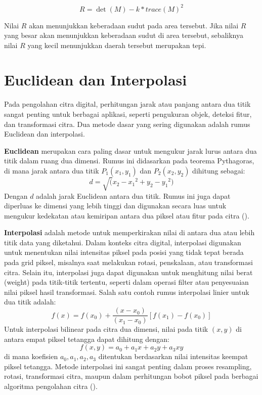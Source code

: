 \begin{equation}
  R = \det(M) - k * {trace(M)}^2
  \label{Harris-Corner Detection}
\end{equation}

  Nilai \(R\) akan menunjukkan keberadaan sudut pada area tersebut. 
Jika nilai \(R\) yang besar akan menunjukkan keberadaan sudut di area tersebut, sebaliknya nilai \(R\) yang kecil menunjukkan daerah tersebut merupakan tepi.

\section{Euclidean dan Interpolasi}
  Pada pengolahan citra digital, perhitungan jarak atau panjang antara dua titik sangat penting untuk berbagai aplikasi, seperti pengukuran objek, deteksi fitur, dan transformasi citra. Dua metode dasar yang sering digunakan adalah rumus Euclidean dan interpolasi.

  \textbf{Euclidean} merupakan cara paling dasar untuk mengukur jarak lurus antara dua titik dalam ruang dua dimensi. Rumus ini didasarkan pada teorema Pythagoras, di mana jarak antara dua titik \(P_1(x_1, y_1)\) dan \(P_2(x_2, y_2)\) dihitung sebagai:
\begin{equation}
  d = \sqrt({x_2 - x_1}^2 + {y_2 - y_1}^2)
  \label{eq:euclidean}
\end{equation}
  Dengan \(d\) adalah jarak Euclidean antara dua titik. Rumus ini juga dapat diperluas ke dimensi yang lebih tinggi dan digunakan secara luas untuk mengukur kedekatan atau kemiripan antara dua piksel atau fitur pada citra (\cite[hlm. 34]{Gonzalez2018}).

  \textbf{Interpolasi} adalah metode untuk memperkirakan nilai di antara dua atau lebih titik data yang diketahui. Dalam konteks citra digital, interpolasi digunakan untuk menentukan nilai intensitas piksel pada posisi yang tidak tepat berada pada grid piksel, misalnya saat melakukan rotasi, penskalaan, atau transformasi citra. Selain itu, interpolasi juga dapat digunakan untuk menghitung nilai berat (weight) pada titik-titik tertentu, seperti dalam operasi filter atau penyesuaian nilai piksel hasil transformasi. Salah satu contoh rumus interpolasi linier untuk dua titik adalah:
\begin{equation}
  f(x) = f(x_0) + \frac{(x - x_0)}{(x_1 - x_0)} \left[ f(x_1) - f(x_0) \right]
  \label{eq:interpolasi-linier}
\end{equation}
  Untuk interpolasi bilinear pada citra dua dimensi, nilai pada titik \((x, y)\) di antara empat piksel tetangga dapat dihitung dengan:
\begin{equation*}
  f(x, y) = a_0 + a_1x + a_2y + a_3xy
  \label{eq:interpolasi-bilinear}
\end{equation*}
  di mana koefisien \(a_0, a_1, a_2, a_3\) ditentukan berdasarkan nilai intensitas keempat piksel tetangga. Metode interpolasi ini sangat penting dalam proses resampling, rotasi, transformasi citra, maupun dalam perhitungan bobot piksel pada berbagai algoritma pengolahan citra (\cite[hlm. 89--91]{Gonzalez2018}).





